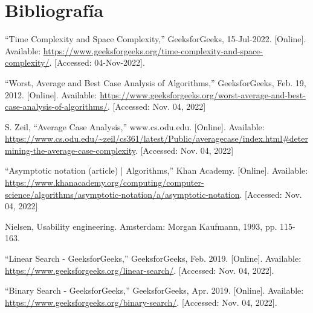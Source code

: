 \section{Bibliografía}
\begin{enumerate}[label={[\arabic*]}]
  \item \label{bib1} “Time Complexity and Space Complexity,” GeeksforGeeks, 15-Jul-2022. [Online]. Available: \url{https://www.geeksforgeeks.org/time-complexity-and-space-complexity/}. [Accessed: 04-Nov-2022].  
  \item \label{bib2} “Worst, Average and Best Case Analysis of Algorithms,” GeeksforGeeks, Feb. 19, 2012. [Online]. Available: \url{https://www.geeksforgeeks.org/worst-average-and-best-case-analysis-of-algorithms/}. [Accessed: Nov. 04, 2022]
\item \label{bib3} S. Zeil, “Average Case Analysis,” www.cs.odu.edu. [Online]. Available: \url{https://www.cs.odu.edu/~zeil/cs361/latest/Public/averagecase/index.html#determining-the-average-case-complexity}. [Accessed: Nov. 04, 2022]

\item \label{bib4} “Asymptotic notation (article) | Algorithms,” Khan Academy. [Online]. Available: \url{https://www.khanacademy.org/computing/computer-science/algorithms/asymptotic-notation/a/asymptotic-notation}. [Accessed: Nov. 04, 2022]
  \item \label{bib5} Nielsen, Usability engineering. Amsterdam: Morgan Kaufmann, 1993, pp. 115-163.
  \item \label{bib6} “Linear Search - GeeksforGeeks,” GeeksforGeeks, Feb. 2019. [Online]. Available: \url{https://www.geeksforgeeks.org/linear-search/}. [Accessed: Nov. 04, 2022].
  \item \label{bib7} “Binary Search - GeeksforGeeks,” GeeksforGeeks, Apr. 2019. [Online]. Available: \url{https://www.geeksforgeeks.org/binary-search/}. [Accessed: Nov. 04, 2022].
\end{enumerate}